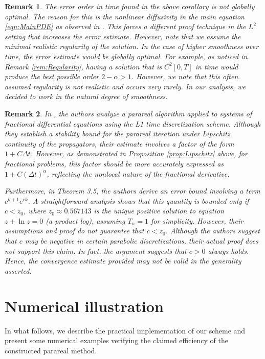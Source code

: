 \documentclass[12pt,a4paper]{article}
\newtheorem{rem}{Remark}
\begin{document}
\begin{rem}
	The error order in time found in the above corollary is not globally optimal. The reason for this is the nonlinear diffusivity in the main equation \eqref{eqn:MainPDE} as observed in \cite{lopez2025convolution}. This forces a different proof technique in the $L^2$ setting that increases the error estimate. However, note that we assume the \textit{minimal} realistic regularity of the solution. In the case of higher smoothness over time, the error estimate would be globally optimal. For example, as noticed in Remark \ref{rem:Regularity}, having a solution that is $C^2[0,T]$ in time would produce the best possible order $2-\alpha > 1$. However, we note that this often assumed regularity is not realistic and occurs very rarely. In our analysis, we decided to work in the natural degree of smoothness.
\end{rem}

\begin{rem}
	In \cite{xu2015parareal}, the authors analyze a parareal algorithm applied to systems of fractional differential equations using the L1 time discretization scheme. Although they establish a stability bound for the parareal iteration under Lipschitz continuity of the propagators, their estimate involves a factor of the form \( 1 + C\Delta t \). However, as demonstrated in Proposition \ref{prop:Lipschitz} above, for fractional problems, this factor should be more accurately expressed as \( 1 + C(\Delta t)^\alpha \), reflecting the nonlocal nature of the fractional derivative.
	
	Furthermore, in Theorem 3.5, the authors derive an error bound involving a term \( c^{k+1} e^{c k} \). A straightforward analysis shows that this quantity is bounded only if \( c < z_0 \), where \( z_0 \approx 0.567143 \) is the unique positive solution to equation \( z + \ln z = 0 \) (a product log), assuming \( T_n = 1 \) for simplicity. However, their assumptions and proof do not guarantee that \( c < z_0 \). Although the authors suggest that \( c \) may be negative in certain parabolic discretizations, their actual proof does not support this claim. In fact, the argument suggests that \( c > 0 \) always holds. Hence, the convergence estimate provided may not be valid in the generality asserted.
\end{rem}

\section{Numerical illustration}
In what follows, we describe the practical implementation of our scheme and present some numerical examples verifying the claimed efficiency of the constructed parareal method.
\end{document}
